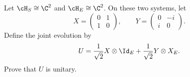 Let $\cH_S\cong\C^2$ and $\cH_E\cong\C^2$. On these two systems, let
$$
X=
\begin{pmatrix}
0&1\\
1&0
\end{pmatrix},
\qquad
Y=
\begin{pmatrix}
0&-i\\
i&0
\end{pmatrix}.
$$
Define the joint evolution by
$$
U=
\frac{1}{\sqrt{2}}X\otimes\Id_E
+
\frac{1}{\sqrt{2}}Y\otimes X_E.
$$
Prove that $U$ is unitary.
